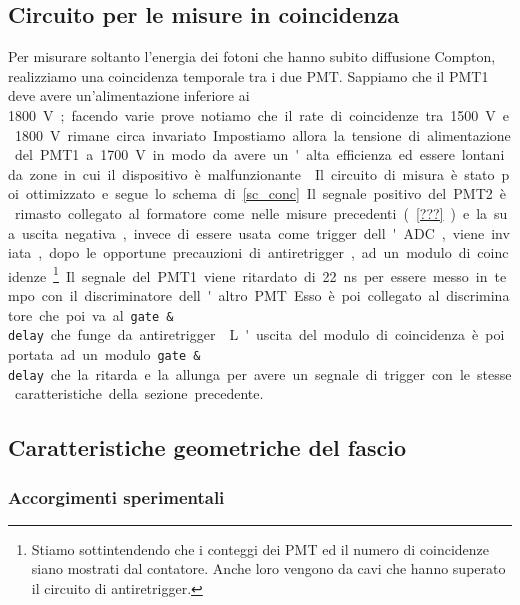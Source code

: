 \subsection{Circuito per le misure in coincidenza}

Per misurare soltanto l'energia dei fotoni che hanno subito diffusione Compton, realizziamo una coincidenza temporale tra i due PMT. Sappiamo che il PMT1 deve avere un'alimentazione inferiore ai \SI{1800}V; facendo varie prove notiamo che il rate di coincidenze tra \SI{1500}V e \SI{1800}V rimane circa invariato. Impostiamo allora la tensione di alimentazione del PMT1 a \SI{1700}V in modo da avere un'alta efficienza ed essere lontani da zone in cui il dispositivo è malfunzionante.

Il circuito di misura è stato poi ottimizzato e segue lo schema di \autoref{sc_conc}. Il segnale positivo del PMT2 è rimasto collegato al formatore come nelle misure precedenti (\autoref{???}) e la sua uscita negativa, invece di essere usata come trigger dell'ADC, viene inviata, dopo le opportune precauzioni di antiretrigger, ad un modulo di coincidenze%
\footnote{Stiamo sottintendendo che i conteggi dei PMT ed il numero di coincidenze siano mostrati dal contatore. Anche loro vengono da cavi che hanno superato il circuito di antiretrigger.}.

Il segnale del PMT1  viene ritardato di \SI{22}{ns} per essere messo in tempo con il discriminatore dell'altro PMT. Esso è poi collegato al discriminatore che poi va al \texttt{gate \& delay} che funge da antiretrigger.

L'uscita del modulo di coincidenza è poi portata ad un modulo \texttt{gate \& delay} che la ritarda e la allunga per avere un segnale di trigger con le stesse caratteristiche della sezione precedente.

\subsection{Caratteristiche geometriche del fascio}

\subsubsection{Accorgimenti sperimentali}

